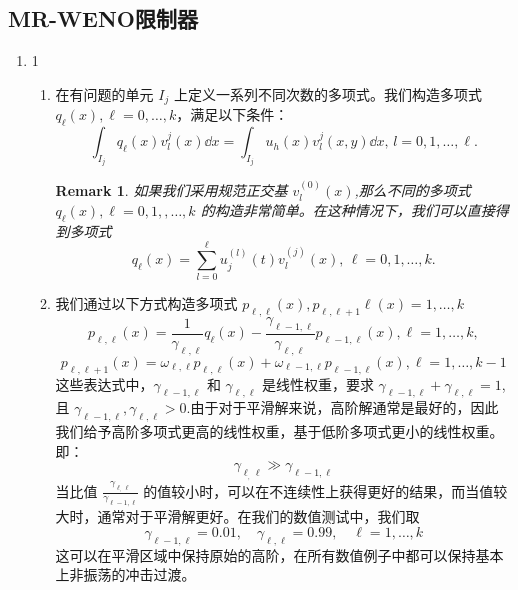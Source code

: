 \documentclass{article}
\newtheorem{remark}{Remark}
\numberwithin{equation}{subsection}    %
\begin{document}
\subsection{MR-WENO限制器}
\begin{enumerate}[label={{\bf Step \arabic*}:}]
    \item 1
          \begin{enumerate}[label={\bf Step 1.\arabic*.}]
              \item 在有问题的单元 $I_j$ 上定义一系列不同次数的多项式。我们构造多项式 $q_{\ell}(x), \ell=0, \ldots, k$，满足以下条件：
                    \begin{equation}
                        \int_{I_j} q_{\ell}(x) v_{l}^{j}(x) \dd x=\int_{I_j} u_{h}(x) v_{l}^{j}(x, y) \dd x,\, l=0,1, \ldots, \ell.
                    \end{equation}
                    \begin{remark}
                        如果我们采用规范正交基 $v_{l}^{(0)}(x)$,那么不同的多项式 $q_{\ell}(x), \ell=0,1,, \ldots, k$ 的构造非常简单。在这种情况下，我们可以直接得到多项式
                        \begin{equation}
                            q_{\ell}(x)=\sum_{l=0}^{\ell} u_{j}^{(l)}(t) v_{l}^{(j)}(x),\,\ell=0,1,\ldots, k.
                        \end{equation}
                    \end{remark}
              \item 我们通过以下方式构造多项式 $p_{\ell, \ell}(x),p_{\ell,\ell+1} \ell(x)=1, \ldots, k$
                    \begin{equation}
                        p_{\ell, \ell}(x)=\frac{1}{\gamma_{\ell, \ell}} q_{\ell}(x)-\frac{\gamma_{\ell-1, \ell}}{\gamma_{\ell, \ell}} p_{\ell-1, \ell}(x), \ell=1, \ldots, k,
                    \end{equation}
                    \begin{equation}
                        p_{\ell, \ell+1}(x)=\omega_{\ell, \ell} p_{\ell, \ell}(x)+\omega_{\ell-1, \ell} p_{\ell-1, \ell}(x), \ell=1, \ldots, k-1
                    \end{equation}
                    这些表达式中，$\gamma_{\ell-1, \ell}$ 和 $\gamma_{\ell, \ell}$ 是线性权重，要求 $\gamma_{\ell-1, \ell}+\gamma_{\ell, \ell}=1$,且 $\gamma_{\ell-1, \ell},\gamma_{\ell, \ell}>0$.由于对于平滑解来说，高阶解通常是最好的，因此我们给予高阶多项式更高的线性权重，基于低阶多项式更小的线性权重。即：
                    \begin{equation}
                        \gamma_{\ell_,\ell} \gg \gamma_{\ell-1,\ell}
                    \end{equation}
                    当比值 $\frac{\gamma_{\ell_,\ell}}{\gamma_{\ell-1,\ell}}$ 的值较小时，可以在不连续性上获得更好的结果，而当值较大时，通常对于平滑解更好。在我们的数值测试中，我们取
                    \begin{equation}
                        \gamma_{\ell-1, \ell}=0.01,\quad  \gamma_{\ell, \ell}=0.99,\quad \ell=1, \ldots, k
                    \end{equation}
                    这可以在平滑区域中保持原始的高阶，在所有数值例子中都可以保持基本上非振荡的冲击过渡。


\end{enumerate}
\end{enumerate}
\end{document}
